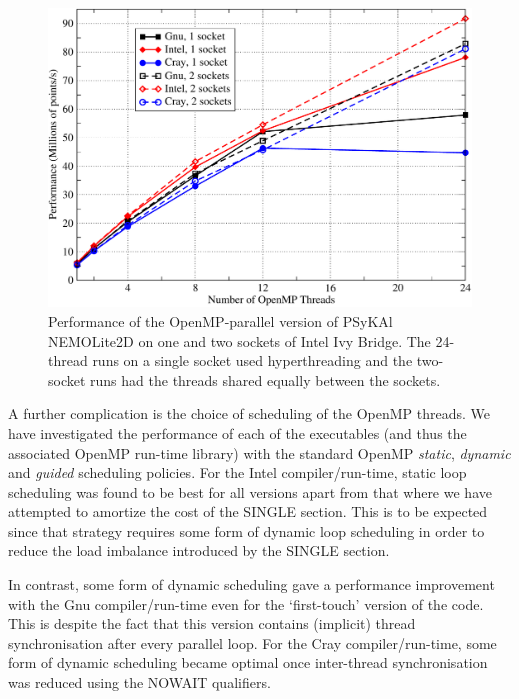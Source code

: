 \documentclass[gmd, manuscript]{copernicus}
\newlength{\picwidth}
\begin{document}
\begin{figure}
\centering
\includegraphics[width=\picwidth]{1and2sockets}
\caption{Performance of the OpenMP-parallel version of {PS}y{KA}l
  NEMOLite2D on one and two sockets of Intel Ivy Bridge. The 24-thread
  runs on a single socket used hyperthreading and the two-socket runs
  had the threads shared equally between the sockets.}
\label{FIG_omp_2socks}
\end{figure}

A further complication is the choice of scheduling of the OpenMP
threads.  We have investigated the performance of each of the
executables (and thus the associated OpenMP run-time library) with the
standard OpenMP \textit{static}, \textit{dynamic} and \textit{guided}
scheduling policies. For the Intel compiler/run-time, static loop
scheduling was found to be best for all versions apart from that where
we have attempted to amortize the cost of the SINGLE section. This is
to be expected since that strategy requires some form of dynamic loop
scheduling in order to reduce the load imbalance introduced by the
SINGLE section.

In contrast, some form of dynamic scheduling gave a performance
improvement with the Gnu compiler/run-time even for the `first-touch'
version of the code. This is despite the fact that this version
contains (implicit) thread synchronisation after every parallel loop.
For the Cray compiler/run-time, some form of dynamic scheduling became
optimal once inter-thread synchronisation was reduced using the NOWAIT
qualifiers.


\end{document}

